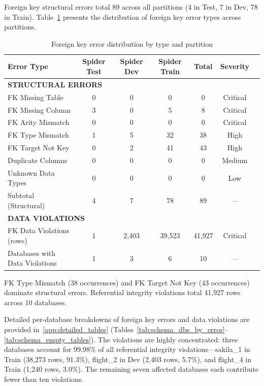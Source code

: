 \documentclass[print]{einformatica}
\begin{document}
Foreign key structural errors total 89 across all partitions (4 in Test, 7 in Dev, 78 in Train). Table~\ref{tab:schema_errors} presents the distribution of foreign key error types across partitions.

\begin{table}[ht]
    \caption{Foreign key error distribution by type and partition}
    \label{tab:schema_errors}
    \centering
    \footnotesize
    \begin{tabular}{lcccccc}
        \toprule
        \textbf{Error Type} & \textbf{Spider Test} & \textbf{Spider Dev} & \textbf{Spider Train} & \textbf{Total} & \textbf{Severity} \\
        \midrule
        \multicolumn{6}{l}{\textbf{STRUCTURAL ERRORS}} \\
        FK Missing Table & 0 & 0 & 0 & 0 & Critical \\
        FK Missing Column & 3 & 0 & 5 & 8 & Critical \\
        FK Arity Mismatch & 0 & 0 & 0 & 0 & Critical \\
        FK Type Mismatch & 1 & 5 & 32 & 38 & High \\
        FK Target Not Key & 0 & 2 & 41 & 43 & High \\
        Duplicate Columns & 0 & 0 & 0 & 0 & Medium \\
        Unknown Data Types & 0 & 0 & 0 & 0 & Low \\
        Subtotal (Structural) & 4 & 7 & 78 & 89 & --- \\
        \multicolumn{6}{l}{\textbf{DATA VIOLATIONS}} \\
        FK Data Violations (rows) & 1 & 2,403 & 39,523 & 41,927 & Critical \\
        Databases with Data Violations & 1 & 3 & 6 & 10 & --- \\
        \bottomrule
    \end{tabular}
\end{table}

FK Type Mismatch (38 occurrences) and FK Target Not Key (43 occurrences) dominate structural errors. Referential integrity violations total 41,927 rows across 10 databases.

Detailed per-database breakdowns of foreign key errors and data violations are provided in~\ref{app:detailed_tables} (Tables~\ref{tab:schema_dbs_by_error}--\ref{tab:schema_empty_tables}). The violations are highly concentrated: three databases account for 99.98\% of all referential integrity violations---sakila\_1 in Train (38,273 rows, 91.3\%), flight\_2 in Dev (2,403 rows, 5.7\%), and flight\_4 in Train (1,240 rows, 3.0\%). The remaining seven affected databases each contribute fewer than ten violations.
\end{document}
